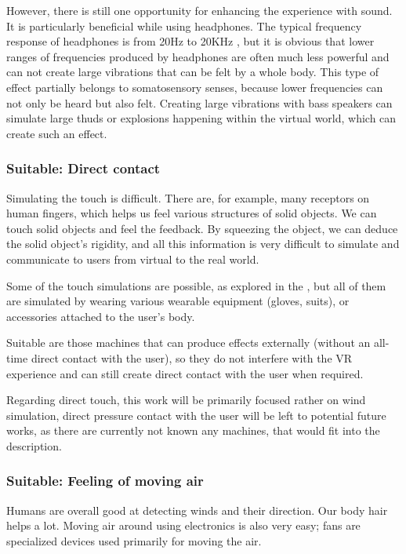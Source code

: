 However, there is still one opportunity for enhancing the experience with sound.
It is particularly beneficial while using headphones. The typical frequency
response of headphones is from 20Hz to 20KHz \hyperlink{freqresp}{}, but it is obvious
that lower ranges of frequencies produced by headphones are often much
less powerful and can not create large vibrations that can be felt by a whole
body. This type of effect partially belongs to somatosensory senses, because
lower frequencies can not only be heard but also felt. Creating large
vibrations with bass speakers can simulate large thuds or explosions
happening within the virtual world, which can create such an effect.


\hypertarget{x-suitable:-direct-contact}{\subsubsection*{Suitable: Direct contact}}
Simulating the touch is difficult. There are, for example, many receptors on
human fingers, which helps us feel various structures of solid
objects. We can touch solid objects and feel the feedback. By squeezing the
object, we can deduce the solid object’s rigidity, and all this
information is very difficult to simulate and communicate to users from
virtual to the real world.


Some of the touch simulations are possible, as explored
in the \hyperlink{./03-current-state-of-effects#hapticexp}{}, but all
of them are simulated by wearing various wearable equipment (gloves, suits),
or accessories attached to the user’s body.


Suitable are those machines that can produce effects externally (without an
all-time direct contact with the user), so they do not interfere with the VR
experience and can still create direct contact with the user when required.


Regarding direct touch, this work will be primarily
focused rather on wind simulation, direct pressure contact with the user will
be left to potential future works, as there are currently not known any
machines, that would fit into the description.


\hypertarget{x-suitable:-feeling-of-moving-air}{\subsubsection*{Suitable: Feeling of moving air}}
Humans are overall good at detecting winds and their direction. Our body hair
helps a lot. Moving air around using electronics is also very easy; fans
are specialized devices used primarily for moving the air.


